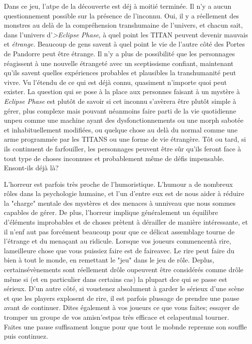 {Dans ce jeu, l'atpe de la découverte est déj à moitié terminée. Il n'y a aucun questionnement possible sur la présence de l'inconnu. Oui, il y a réellement des monstres au delà de la compréhension transhumaine de l'univers, et chacun sait, dans l'univers d'\textit{>Eclipse Phase}, à quel point  les TITAN peuvent devenir mauvais et \textit{étrange.} Beaucoup de gens savent à quel point le vie de l'autre côté des Portes de Pandorre peut être étrange. Il n'y a plus de possibilité que les personnages réagissent à une nouvelle étrangeté avec un sceptissisme confiant, maintenant qu'ils savent quelles expériences probables et plausibles la transhumanité peut vivre. Vu l'étendu de ce qui est déjà connu, quasiment n'importe quoi peut exister. La question qui se pose à la place aux personnes faisant à un mystère à \textit{Eclipse Phase} est plutôt de savoir si cet inconnu s'avèrera être plutôt simple à gérer, plus complexe mais pouvant néanmoins faire parti de la vie quotidienne unpeu comme une machine ayant des dysfonctionnements ou une morph sabotée et inhabituellement modifiées, ou quelque chose au delà du normal comme une arme programmée par les TITANS ou une forme de vie étrangère. Tôt ou tard, si ils continuent de farfouiller, les personnages peuvent être sûr qu'ils feront face à tout type de choses inconnues et probablement même de défis impensable. Ensont-ils déjà là? 

L'horreur est parfois très proche de l'humoristique. L'humour a de nombreux rôles dans la psychologie humaine, et l'un d'entre eux est de nous aider à réduire la "charge" mentale des mystères et des menaces à unniveau que nous sommes capables de gérer. De plus, l'horreur implique généralement un équilibre d'éléments improbables et de choses prètent à dérailler de manière intéressante, et il n'enf aut pas forcément beaucoup pour que ce délicat assemblage tourne de l'étrange et du menaçant au ridicule. Lorsque vos joueurs commencentà rire, lameilleure chose que vous puissiez faire est de faireavec. Le rire peut faire du bien à tout le monde, en remettant le "jeu" dans le jeu de rôle. Deplus, certainsévènements sont réellement drôle oupeuvent être considérés comme drôle même si (et en particulier dans certains cas) la plupart dce qui se passe est sérieux. D'un autre côté, si voustenez absolument à garder le sérieux d'une scène et que les players explosent de rire, il est parfois plussage de prendre une pause avant de continuer. Dites également à vos joueurs ce que vous faites; essayer de tromper un groupe de vos amisn'estpas très efficace et celapeutmal tourner. Faites une pause suffisament longue pour que tout le mobnde reprenne son souffle puis continuez. 

}
